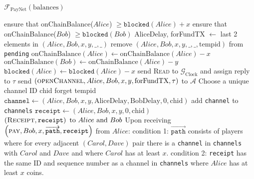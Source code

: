 \begin{functionality}{$\mathcal{F}_{\mathrm{PayNet}}
\left(\mathrm{balances}\right)$}
\begin{algorithmic}[1]
      \State ensure that onChainBalance($Alice$) $\geq
      \mathtt{blocked}\left(Alice\right) + x$
      \State ensure that onChainBalance($Bob$) $\geq
      \mathtt{blocked}\left(Bob\right)$
      \State AliceDelay, forFundTX $\gets$ last 2 elements in $\left(Alice,
      Bob, x, y, \_, \_\right)$
      \State remove $\left(Alice, Bob, x, y, \_, \_, \mathrm{tempid}\right)$
      from \texttt{pending}
      \State $\mathrm{onChainBalance}\left(Alice\right) \gets
      \mathrm{onChainBalance}\left(Alice\right) - x$
      \State $\mathrm{onChainBalance}\left(Bob\right) \gets
      \mathrm{onChainBalance}\left(Alice\right) - y$
      \State $\mathtt{blocked}\left(Alice\right) \gets
      \mathtt{blocked}\left(Alice\right) - x$
      \State send \textsc{Read} to $\mathcal{G}_{\mathrm{Clock}}$ and assign
      reply to $\tau$
      \State send $\left(\textsc{openChannel}, Alice, Bob, x, y,
      \mathrm{forFundTX}, \tau\right)$ to $\mathcal{A}$ 
      \State Choose a unique channel ID chid
      \State forget tempid
      \State $\mathtt{channel} \gets \left(Alice, Bob, x, y,
      \mathrm{AliceDelay}, \mathrm{BobDelay}, 0, \mathrm{chid}\right)$
      \State add \texttt{channel} to \texttt{channels}
      \State $\mathtt{receipt} \gets \left(Alice, Bob, x, y, 0,
      \mathrm{chid}\right)$
      \State \Return $\left(\textsc{Receipt}, \mathtt{receipt}\right) \text{
      to } Alice \text{ and } Bob$
    \EndIndent
    \State {}
    \State {}
    \State Upon receiving $\left(\textsc{pay}, Bob, x,
    \overrightarrow{\mathtt{path}}, \mathtt{receipt}\right)$ from $Alice$:
    \Indent
      \State condition 1: $\overrightarrow{\mathtt{path}}$ consists of players
      where for every adjacent $\left(Carol, Dave\right)$ pair there is a
      \texttt{channel} in \texttt{channels} with $Carol$ and $Dave$ and where
      $Carol$ has at least $x$.
      \State condition 2: \texttt{receipt} has the same ID and sequence number
      as a channel in \texttt{channels} where $Alice$ has at least $x$ coins.
\end{algorithmic}
\end{functionality}
